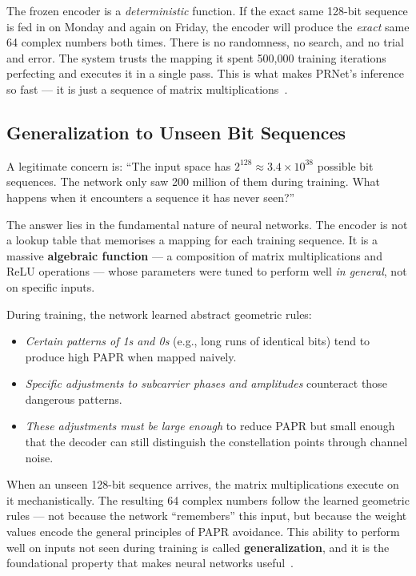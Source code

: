 \begin{keyinsight}
    The frozen encoder is a \emph{deterministic} function.  If the
    exact same 128-bit sequence is fed in on Monday and again on Friday,
    the encoder will produce the \emph{exact} same 64 complex numbers
    both times.  There is no randomness, no search, and no trial and
    error.  The system trusts the mapping it spent 500{,}000 training
    iterations perfecting and executes it in a single pass.  This is
    what makes PRNet's inference so fast --- it is just a sequence of
    matrix multiplications~\cite{kim2017novel}.
\end{keyinsight}


\subsection{Generalization to Unseen Bit Sequences}

A legitimate concern is: ``The input space has $2^{128} \approx 3.4
\times 10^{38}$ possible bit sequences.  The network only saw 200 million
of them during training.  What happens when it encounters a sequence it
has never seen?''

The answer lies in the fundamental nature of neural networks.  The encoder
is not a lookup table that memorises a mapping for each training sequence.
It is a massive \textbf{algebraic function} --- a composition of matrix
multiplications and ReLU operations --- whose parameters were tuned to
perform well \emph{in general}, not on specific inputs.

During training, the network learned abstract geometric rules:
\begin{itemize}
    \item \emph{Certain patterns of 1s and 0s} (e.g., long runs of identical
          bits) tend to produce high PAPR when mapped naively.
    \item \emph{Specific adjustments to subcarrier phases and amplitudes}
          counteract those dangerous patterns.
    \item \emph{These adjustments must be large enough} to reduce PAPR
          but small enough that the decoder can still distinguish the
          constellation points through channel noise.
\end{itemize}

When an unseen 128-bit sequence arrives, the matrix multiplications execute
on it mechanistically.  The resulting 64 complex numbers follow the learned
geometric rules --- not because the network ``remembers'' this input, but
because the weight values encode the general principles of PAPR avoidance.
This ability to perform well on inputs not seen during training is called
\textbf{generalization}, and it is the foundational property that makes
neural networks useful~\cite{kim2017novel}.


